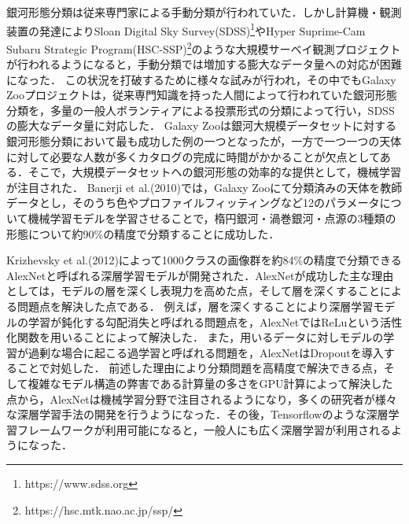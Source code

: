 \documentclass[a4j, 11pt]{jreport}
\begin{document}

銀河形態分類は従来専門家による手動分類が行われていた．しかし計算機・観測装置の発達によりSloan Digital Sky Survey(SDSS)\footnote{https://www.sdss.org}やHyper Suprime-Cam Subaru Strategic Program(HSC-SSP)\footnote{https://hsc.mtk.nao.ac.jp/ssp/}\cite{Tampo2020}のような大規模サーベイ観測プロジェクトが行われるようになると，手動分類では増加する膨大なデータ量への対応が困難になった．
この状況を打破するために様々な試みが行われ，その中でもGalaxy Zooプロジェクト\cite{Lintott2008}は，従来専門知識を持った人間によって行われていた銀河形態分類を，多量の一般人ボランティアによる投票形式の分類によって行い，SDSSの膨大なデータ量に対応した．
Galaxy Zooは銀河大規模データセットに対する銀河形態分類において最も成功した例の一つとなったが，一方で一つ一つの天体に対して必要な人数が多くカタログの完成に時間がかかることが欠点としてある．そこで，大規模データセットへの銀河形態の効率的な提供として，機械学習が注目された．
Banerji et al.(2010)\cite{Banerji2010}では，Galaxy Zooにて分類済みの天体を教師データとし，そのうち色やプロファイルフィッティングなど12のパラメータについて機械学習モデルを学習させることで，楕円銀河・渦巻銀河・点源の3種類の形態について約90\%の精度で分類することに成功した．

Krizhevsky et al.(2012)\cite{Krizhevsky2012}によって1000クラスの画像群を約84\%の精度で分類できるAlexNetと呼ばれる深層学習モデルが開発された．AlexNetが成功した主な理由としては，モデルの層を深くし表現力を高めた点，そして層を深くすることによる問題点を解決した点である．
例えば，層を深くすることにより深層学習モデルの学習が鈍化する勾配消失と呼ばれる問題点を，AlexNetではReLu\cite{Glorot2011}という活性化関数を用いることによって解決した．
また，用いるデータに対しモデルの学習が過剰な場合に起こる過学習と呼ばれる問題を，AlexNetはDropout\cite{Srivastava2014}を導入することで対処した．
前述した理由により分類問題を高精度で解決できる点，そして複雑なモデル構造の弊害である計算量の多さをGPU計算によって解決した点から，AlexNetは機械学習分野で注目されるようになり，多くの研究者が様々な深層学習手法の開発を行うようになった．その後，Tensorflow\cite{Abadi2016}のような深層学習フレームワークが利用可能になると，一般人にも広く深層学習が利用されるようになった．
\end{document}
